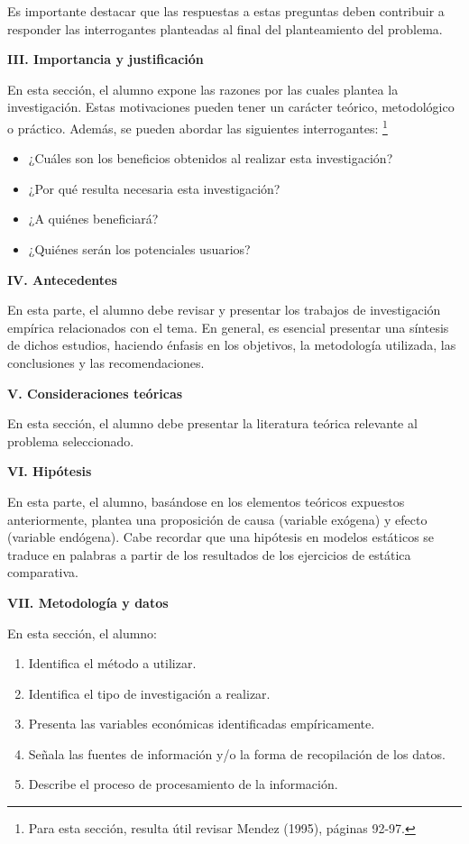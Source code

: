 \documentclass[
  a4paper,
]{article}
\providecommand{\tightlist}{%
  \setlength{\itemsep}{0pt}\setlength{\parskip}{0pt}}\usepackage{longtable,booktabs,array}
\begin{document}
Es importante destacar que las respuestas a estas preguntas deben
contribuir a responder las interrogantes planteadas al final del
planteamiento del problema.

\textbf{III. Importancia y justificación}

En esta sección, el alumno expone las razones por las cuales plantea la
investigación. Estas motivaciones pueden tener un carácter teórico,
metodológico o práctico. Además, se pueden abordar las siguientes
interrogantes: \footnote{Para esta sección, resulta útil revisar Mendez
  (1995), páginas 92-97.}

\begin{itemize}
\tightlist
\item
  ¿Cuáles son los beneficios obtenidos al realizar esta investigación?
\item
  ¿Por qué resulta necesaria esta investigación?
\item
  ¿A quiénes beneficiará?
\item
  ¿Quiénes serán los potenciales usuarios?
\end{itemize}

\textbf{IV. Antecedentes}

En esta parte, el alumno debe revisar y presentar los trabajos de
investigación empírica relacionados con el tema. En general, es esencial
presentar una síntesis de dichos estudios, haciendo énfasis en los
objetivos, la metodología utilizada, las conclusiones y las
recomendaciones.

\textbf{V. Consideraciones teóricas}

En esta sección, el alumno debe presentar la literatura teórica
relevante al problema seleccionado.

\textbf{VI. Hipótesis}

En esta parte, el alumno, basándose en los elementos teóricos expuestos
anteriormente, plantea una proposición de causa (variable exógena) y
efecto (variable endógena). Cabe recordar que una hipótesis en modelos
estáticos se traduce en palabras a partir de los resultados de los
ejercicios de estática comparativa.

\textbf{VII. Metodología y datos}

En esta sección, el alumno:

\begin{enumerate}
\def\labelenumi{\arabic{enumi}.}
\tightlist
\item
  Identifica el método a utilizar.
\item
  Identifica el tipo de investigación a realizar.
\item
  Presenta las variables económicas identificadas empíricamente.
\item
  Señala las fuentes de información y/o la forma de recopilación de los
  datos.
\item
  Describe el proceso de procesamiento de la información.
\end{enumerate}
\end{document}
